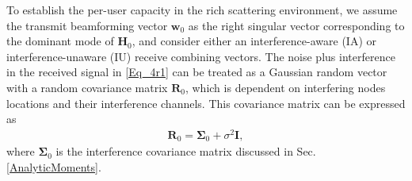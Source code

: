 \documentclass[12pt, draftclsnofoot, onecolumn]{IEEEtran}
\theoremstyle{plain}
\begin{document}
{\color{black}To establish the per-user capacity in the rich scattering environment, we assume the transmit beamforming vector $\mathbf{w}_{0}$ as the right singular vector corresponding to the dominant mode of $\textbf{H}_{0}$, and consider either an interference-aware (IA) or interference-unaware (IU) receive combining vectors.} 
The noise plus interference in the received signal in \eqref{Eq_4r1} can be treated as a Gaussian random vector with a random covariance matrix $\textbf{R}_0$, which is dependent on interfering nodes locations and their interference channels. This covariance matrix can be expressed as \vspace{-.1in}
\begin{eqnarray}
\textbf{R}_{0}=\boldsymbol{\Sigma}_{0}+\sigma^2 \mathbf{I},
\end{eqnarray}
where $\boldsymbol{\Sigma}_{0}$ is the interference covariance matrix discussed in Sec. \ref{AnalyticMoments}. 
\end{document}
